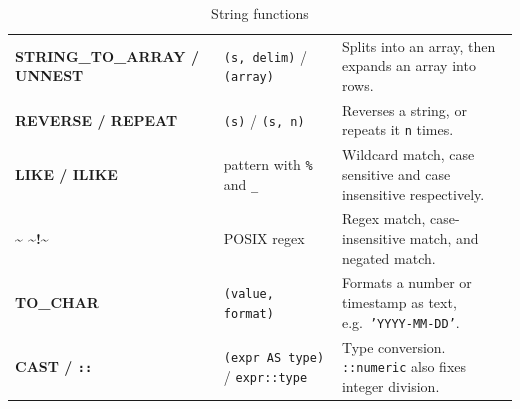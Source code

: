 \begin{table}[H]
\begin{tabularx}{\textwidth}{>{\raggedright\arraybackslash}p{} >{\raggedright\arraybackslash}p{} >{\raggedright\arraybackslash}X}
\textbf{STRING\_TO\_\allowbreak ARRAY / UNNEST} & \texttt{(s, delim)} / \texttt{(array)} & Splits into an array, then expands an array into rows. \\
\textbf{REVERSE / REPEAT} & \texttt{(s)} / \texttt{(s, n)} & Reverses a string, or repeats it \texttt{n} times. \\
\textbf{LIKE / ILIKE} & pattern with \texttt{\%} and \texttt{\_} & Wildcard match, case sensitive and case insensitive respectively. \\
\textbf{\textasciitilde{} \textasciitilde* !\textasciitilde{}} & POSIX regex & Regex match, case-insensitive match, and negated match. \\
\textbf{TO\_CHAR} & \texttt{(value, format)} & Formats a number or timestamp as text, e.g.\ \texttt{'YYYY-MM-DD'}. \\
\textbf{CAST / \texttt{::}} & \texttt{(expr AS type)} / \texttt{expr::type} & Type conversion. \texttt{::numeric} also fixes integer division. \\
\bottomrule
\end{tabularx}
\caption*{String functions}
\end{table}
